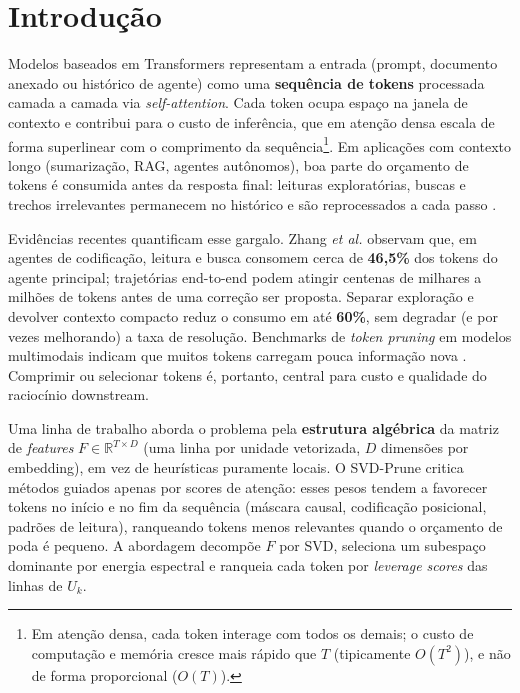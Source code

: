 \section{Introdução}\label{sec:intro}

Modelos baseados em Transformers representam a entrada (prompt, documento anexado ou histórico de agente) como uma \textbf{sequência de tokens} processada camada a camada via \emph{self-attention}. Cada token ocupa espaço na janela de contexto e contribui para o custo de inferência, que em atenção densa escala de forma superlinear com o comprimento da sequência\footnote{Em atenção densa, cada token interage com todos os demais; o custo de computação e memória cresce mais rápido que $T$ (tipicamente $O(T^2)$), e não de forma proporcional ($O(T)$).}. Em aplicações com contexto longo (sumarização, RAG, agentes autônomos), boa parte do orçamento de tokens é consumida antes da resposta final: leituras exploratórias, buscas e trechos irrelevantes permanecem no histórico e são reprocessados a cada passo \cite{zhang2026fastcontext,chen2024fastv}.

Evidências recentes quantificam esse gargalo. Zhang \emph{et al.} \cite{zhang2026fastcontext} observam que, em agentes de codificação, leitura e busca consomem cerca de \textbf{46{,}5\%} dos tokens do agente principal; trajetórias end-to-end podem atingir centenas de milhares a milhões de tokens antes de uma correção ser proposta. Separar exploração e devolver contexto compacto reduz o consumo em até \textbf{60\%}, sem degradar (e por vezes melhorando) a taxa de resolução. Benchmarks de \emph{token pruning} em modelos multimodais indicam que muitos tokens carregam pouca informação nova \cite{chen2024fastv,yang2024visionzip}. Comprimir ou selecionar tokens é, portanto, central para custo e qualidade do raciocínio downstream.

Uma linha de trabalho aborda o problema pela \textbf{estrutura algébrica} da matriz de \emph{features} $F \in \mathbb{R}^{T \times D}$ (uma linha por unidade vetorizada, $D$ dimensões por embedding), em vez de heurísticas puramente locais. O SVD-Prune \cite{apedo2026svdprune} critica métodos guiados apenas por scores de atenção: esses pesos tendem a favorecer tokens no início e no fim da sequência (máscara causal, codificação posicional, padrões de leitura), ranqueando tokens menos relevantes quando o orçamento de poda é pequeno. A abordagem decompõe $F$ por SVD, seleciona um subespaço dominante por energia espectral e ranqueia cada token por \emph{leverage scores} das linhas de $U_k$.

